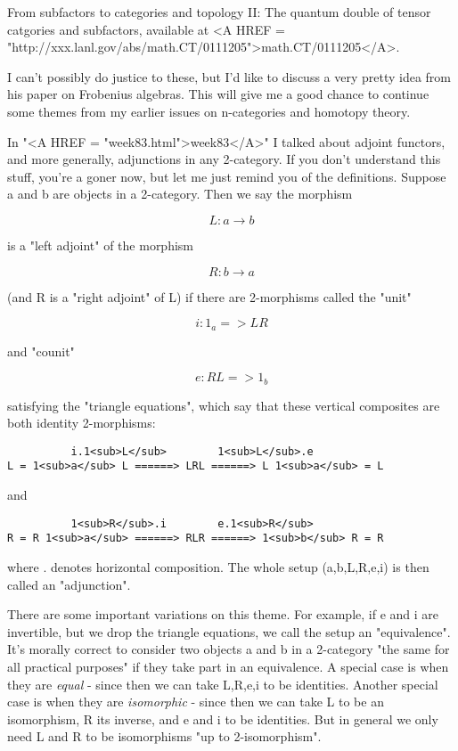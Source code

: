 From subfactors to categories and topology II: The quantum double
of tensor catgories and subfactors, available at <A HREF = "http://xxx.lanl.gov/abs/math.CT/0111205">math.CT/0111205</A>.

I can't possibly do justice to these, but I'd like to discuss a very
pretty idea from his paper on Frobenius algebras.  This will give me a
good chance to continue some themes from my earlier issues on
n-categories and homotopy theory.

In "<A HREF = "week83.html">week83</A>" I talked about adjoint functors, and more generally, 
adjunctions in any 2-category.  If you don't understand this stuff,
you're a goner now, but let me just remind you of the definitions. 
Suppose a and b are objects in a 2-category.  Then we say the morphism

$$
L: a \to  b
$$
    
is a "left adjoint" of the morphism

$$
R: b \to  a
$$
    
(and R is a "right adjoint" of L) if there are 2-morphisms called
the "unit"

$$
i: 1_{a} => LR
$$
    
and "counit"

$$
e: RL => 1_{b}
$$
    
satisfying the "triangle equations", which say that these
vertical composites are both identity 2-morphisms:

\begin{verbatim}
          i.1<sub>L</sub>        1<sub>L</sub>.e
L = 1<sub>a</sub> L ======> LRL ======> L 1<sub>a</sub> = L
\end{verbatim}
    
and
\begin{verbatim}
          1<sub>R</sub>.i        e.1<sub>R</sub>
R = R 1<sub>a</sub> ======> RLR ======> 1<sub>b</sub> R = R
\end{verbatim}
    

where . denotes horizontal composition.  The whole setup (a,b,L,R,e,i)
is then called an "adjunction".  


There are some important variations on this theme.  For example, if e
and i are invertible, but we drop the triangle equations, we call the
setup an "equivalence".  It's morally correct to consider two
objects a and b in a 2-category "the same for all practical
purposes" if they take part in an equivalence.  A special case is
when they are \emph{equal} - since then we can take L,R,e,i to be
identities.  Another special case is when they are \emph{isomorphic} -
since then we can take L to be an isomorphism, R its inverse, and e and
i to be identities.  But in general we only need L and R to be
isomorphisms "up to 2-isomorphism".

